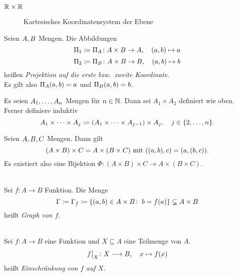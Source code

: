 \documentclass[../ana1.tex]{subfiles}
\begin{document}
\begin{bsp}\(\mathbb{R} \times \mathbb{R} \) \\
	\begin{figure}[h!]
		\centering
		\caption{Kartesisches Koordinatensystem der Ebene}
	\end{figure}
\end{bsp}

\begin{defi*}
	Seien \(A , B \) Mengen. Die Abbildungen
	\[\Pi_1 \coloneqq \Pi_A \colon A \times B \rightarrow A , \quad (a , b) \mapsto a \]
	\[\Pi_2 \coloneqq \Pi_B \colon A \times B \rightarrow B , \quad (a , b) \mapsto b \]
	heißen \textit{Projektion auf die erste bzw.\ zweite Koordinate}. \\
	Es gilt also \(\Pi_A(a , b) = a \) und \(\Pi_B(a , b) = b\).
\end{defi*}

\begin{defi*}
	Es seien \(A_1 , \ldots , A_n \) Mengen für \(n \in \mathbb{N} \). Dann sei \(A_1 \times A_2 \) definiert wie oben.
	Ferner definiere induktiv
	\[A_1 \times \cdots \times A_j \coloneqq (A_1 \times \cdots \times A_{j-1}) \times A_j , \quad j \in \{2 , \ldots , n\}.\]
\end{defi*}

\begin{bem}
	Seien \(A , B , C\) Mengen. Dann gilt
	\[(A \times B) \times C = A \times (B \times C) \text{ mit } ((a , b) , c) = (a , (b , c)).\]
	Es existiert also eine Bijektion \(\Phi \colon (A \times B) \times C \longrightarrow A \times (B \times C)\).
\end{bem}

\begin{defi}\leavevmode \\
	Sei \(f \colon A \longrightarrow B \) Funktion. Die Menge
	\[\Gamma \coloneqq \Gamma_f \coloneqq \{(a , b) \in A \times B \colon \; b = f(a)\} \varsubsetneq A \times B \]
	heißt \textit{Graph von \(f\)}.
	\iftoggle{short}{}{
		\begin{figure}[h!]
			\centering
			\subfloat[Graph]{\subgraphic{0.3}{img05.pdf}}
			\qquad
			\subfloat[Kein Graph]{\subgraphic{0.3}{img06.pdf}}
		\end{figure}
	}
\end{defi}

\begin{notation}\leavevmode \\
	Sei \(f \colon A \longrightarrow B \) eine Funktion und \(X \subseteq A\) eine Teilmenge von \(A \).
	\[\restr{f}{X} \colon X \longrightarrow B \ko \quad x \mapsto f(x)\]
	heißt \textit{Einschränkung von \(f \) auf \(X \)}.
\end{notation}
\end{document}
